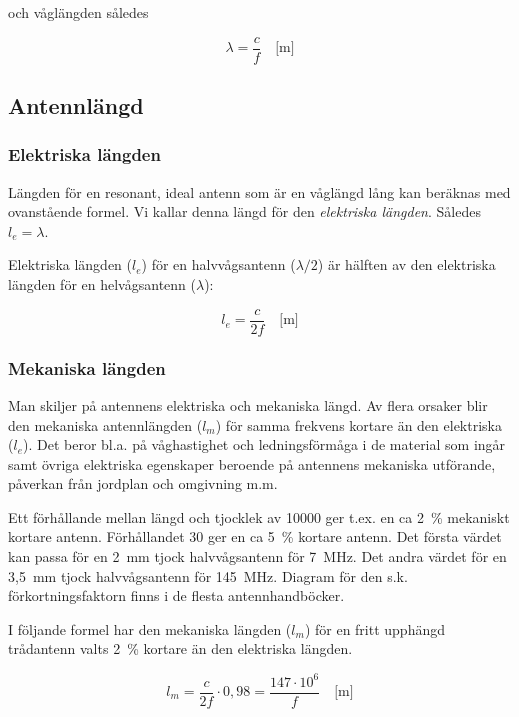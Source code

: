 och våglängden således

\[ \lambda = \frac{c}{f} \quad \text{[m]} \]

\subsection{Antennlängd}

\subsubsection{Elektriska längden}

Längden för en resonant, ideal antenn som är en våglängd lång kan beräknas med
ovanstående formel.
Vi kallar denna längd för den \emph{elektriska längden}.
Således \(l_e = \lambda\).

Elektriska längden (\(l_e\)) för en halvvågsantenn (\(\lambda/2\)) är hälften
av den elektriska längden för en helvågsantenn (\(\lambda\)):

\[l_e = \frac{c}{2f} \quad \text{[m]}\]

\subsubsection{Mekaniska längden}

Man skiljer på antennens elektriska och mekaniska längd.
Av flera orsaker blir den mekaniska antennlängden (\(l_m\)) för samma
frekvens kortare än den elektriska (\(l_e\)).
Det beror bl.a. på våghastighet och ledningsförmåga i de material som ingår
samt övriga elektriska egenskaper beroende på antennens mekaniska utförande,
påverkan från jordplan och omgivning m.m.

Ett förhållande mellan längd och tjocklek av 10000 ger t.ex. en ca 2~\%
mekaniskt kortare antenn.
Förhållandet 30 ger en ca 5~\% kortare antenn.
Det första värdet kan passa för en 2~mm tjock halvvågsantenn för 7~MHz.
Det andra värdet för en 3,5~mm tjock halvvågsantenn för 145~MHz.
Diagram för den s.k. förkortningsfaktorn finns i de flesta antennhandböcker.

I följande formel har den mekaniska längden (\(l_m\)) för en fritt upphängd
trådantenn valts 2~\% kortare än den elektriska längden.

\[l_m = \frac{c}{2f} \cdot 0,98 = \frac{147\cdot 10^6}{f} \quad \text{[m]}\]

